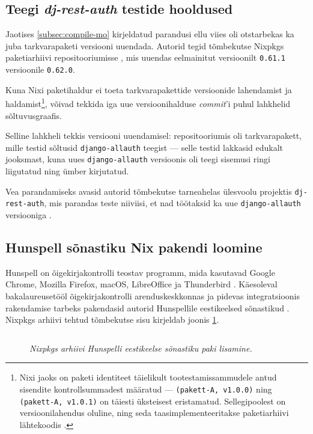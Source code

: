 \subsection{Teegi \textit{dj-rest-auth} testide hooldused}

Jaotises \ref{subsec:compile-mo} kirjeldatud parandusi ellu viies oli otstarbekas ka juba tarkvarapaketi versiooni uuendada. Autorid tegid tõmbekutse Nixpkgs paketiarhiivi repositooriumisse \cite{allauth-bump-nixpkgs}, mis uuendas eelmainitut versioonilt \texttt{0.61.1} versioonile \texttt{0.62.0}.

Kuna Nixi paketihaldur ei toeta tarkvarapakettide versioonide lahendamist ja haldamist\footnote{Nixi jaoks on paketi identiteet täielikult tootestamissammudele antud sisendite kontrollsummadest määratud \cite{nixos-how-nix-works} — \texttt{(pakett-A, v1.0.0)} ning \texttt{(pakett-A, v1.0.1)} on täiesti üksteisest eristamatud. Sellegipoolest on versioonilahendus oluline, ning seda taasimplementeeritakse paketiarhiivi lähtekoodis \cite{python3-nix-versioning}.}, võivad tekkida iga uue versioonihalduse \emph{commit}'i puhul lahkhelid sõltuvusgraafis.

Selline lahkheli tekkis versiooni uuendamisel: repositooriumis oli tarkvarapakett, mille testid sõltusid \texttt{django-allauth} teegist \cite{test-dep} — selle testid lakkasid edukalt jooksmast, kuna uues \texttt{django-allauth} versioonis oli teegi sisemusi ringi liigutatud ning ümber kirjutatud.

Vea parandamiseks avasid autorid tõmbekutse tarneahelas ülesvoolu projektis \texttt{dj-rest-auth}, mis parandas teste niiviisi, et nad töötaksid ka uue \texttt{django-allauth} versiooniga \cite{dj-rest-pr}.

\subsection{Hunspell sõnastiku Nix pakendi loomine}

Hunspell on õigekirjakontrolli teostav programm, mida kasutavad Google Chrome, Mozilla Firefox, macOS, LibreOffice ja Thunderbird \cite{hunspell}.
Käesoleval bakalaureusetööl õigekirjakontrolli arenduskeskkonnas ja pidevas integratsioonis rakendamise tarbeks pakendasid autorid Hunspellile eestikeelsed sõnastikud \cite{hunspell-pr}. Nixpkgs arhiivi tehtud tõmbekutse sisu kirjeldab joonis \ref{fig:hunspell-pr}.

\begin{figure}[H]
\inputminted[breaklines]{diff}{chapters/data/hunspell.diff}
\caption{\emph{Nixpkgs arhiivi Hunspelli eestikeelse sõnastiku paki lisamine.}}\label{fig:hunspell-pr}
\end{figure}

